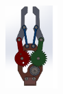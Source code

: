\documentclass[a4paper,11pt]{article}
\begin{document}
\begin{figure}[H]
    \begin{minipage}[c]{.46\linewidth}
        \centering
        \includegraphics[height = 120]{pince_ferm.png}
    \end{minipage}
    \hfill
    \begin{minipage}[c]{.46\linewidth}
        \centering

\end{minipage}
\end{figure}
\end{document}
